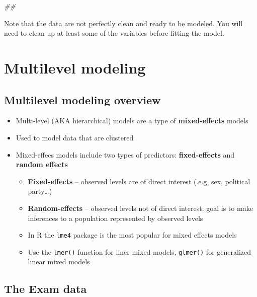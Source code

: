 \documentclass[
]{book}
\newenvironment{Shaded}{\begin{snugshade}}{\end{snugshade}}
\newcommand{\CommentTok}[1]{\textcolor[rgb]{0.56,0.35,0.01}{\textit{#1}}}
\providecommand{\tightlist}{%
  \setlength{\itemsep}{0pt}\setlength{\parskip}{0pt}}
\begin{document}
\begin{Shaded}
\begin{Highlighting}[]
\CommentTok{## }
\end{Highlighting}
\end{Shaded}

Note that the data are not perfectly clean and ready to be modeled. You will need to clean up at least some of the variables before fitting the model.

\hypertarget{multilevel-modeling}{%
\section{Multilevel modeling}\label{multilevel-modeling}}

\hypertarget{multilevel-modeling-overview}{%
\subsection{Multilevel modeling overview}\label{multilevel-modeling-overview}}

\begin{itemize}
\tightlist
\item
  Multi-level (AKA hierarchical) models are a type of \textbf{mixed-effects} models
\item
  Used to model data that are clustered
\item
  Mixed-effecs models include two types of predictors: \textbf{fixed-effects} and \textbf{random effects}

  \begin{itemize}
  \tightlist
  \item
    \textbf{Fixed-effects} -- observed levels are of direct interest (.e.g, sex, political party\ldots)
  \item
    \textbf{Random-effects} -- observed levels not of direct interest: goal is to make inferences to a population represented by observed levels
  \item
    In R the \texttt{lme4} package is the most popular for mixed effects models
  \item
    Use the \texttt{lmer()} function for liner mixed models, \texttt{glmer()} for generalized linear mixed models
  \end{itemize}
\end{itemize}

\hypertarget{the-exam-data}{%
\subsection{The Exam data}\label{the-exam-data}}
\end{document}

